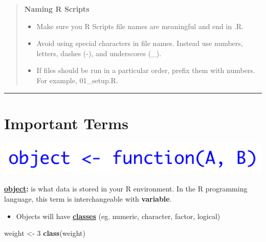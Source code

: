 \documentclass[
]{book}
\newenvironment{Shaded}{\begin{snugshade}}{\end{snugshade}}
\newcommand{\DecValTok}[1]{\textcolor[rgb]{0.00,0.00,0.81}{#1}}
\newcommand{\KeywordTok}[1]{\textcolor[rgb]{0.13,0.29,0.53}{\textbf{#1}}}
\newcommand{\NormalTok}[1]{#1}
\newcommand{\StringTok}[1]{\textcolor[rgb]{0.31,0.60,0.02}{#1}}
\providecommand{\tightlist}{%
  \setlength{\itemsep}{0pt}\setlength{\parskip}{0pt}}
\begin{document}
\begin{quote}
\textbf{Naming R Scripts}

\begin{itemize}
\item
  Make sure you R Scripts file names are meaningful and end in .R.
\item
  Avoid using special characters in file names. Instead use numbers, letters, dashes (-), and underscores (\_).
\item
  If files should be run in a particular order, prefix them with numbers. For example, 01\_setup.R.
\end{itemize}
\end{quote}

\begin{center}\rule{0.5\linewidth}{0.5pt}\end{center}

\hypertarget{important-terms}{%
\section{Important Terms}\label{important-terms}}

\begin{center}\includegraphics[width=6.64in]{img/definitions} \end{center}

\href{https://cran.r-project.org/doc/manuals/r-release/R-lang.html\#Objects}{\textbf{object}}\textbf{:} is what data is stored in your R environment. In the R programming language, this term is interchangeable with \textbf{variable}.

\begin{itemize}
\tightlist
\item
  Objects will have \href{http://www.diegobarneche.com/2014-12-11-ufsc/lessons/01-intro_r/data-structures.html}{\textbf{classes}} (eg. numeric, character, factor, logical)
\end{itemize}

\begin{Shaded}
\begin{Highlighting}[]
\NormalTok{weight \textless{}{-}}\StringTok{ }\DecValTok{3}
\KeywordTok{class}\NormalTok{(weight)}
\end{Highlighting}
\end{Shaded}
\end{document}
